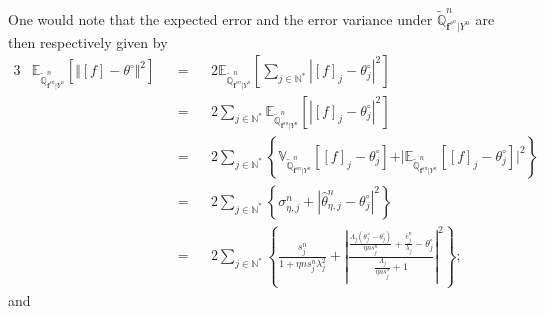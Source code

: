 One would note that the expected error and the error variance under $\widetilde{\mathds{Q}}_{\boldsymbol{f}^{s^{n}} \vert Y^{n}}^{n}$ are then respectively given by
\begin{alignat*}{3}
&\mathds{E}_{\widetilde{\mathds{Q}}_{\boldsymbol{f}^{s{n}} \vert Y^{n}}^{n}}\left[\Vert [f] - \theta^{\circ} \Vert^{2}\right] &&=&& 2 \mathds{E}_{\widetilde{\mathds{Q}}_{\boldsymbol{f}^{s{n}} \vert Y^{n}}^{n}}\left[\sum\limits_{j \in \mathds{N^{*}}} \left\vert[f]_{j} - \theta^{\circ}_{j} \right\vert^{2}\right]\\
& &&=&& 2 \sum\limits_{j \in \mathds{N^{*}}} \mathds{E}_{\widetilde{\mathds{Q}}_{\boldsymbol{f}^{s{n}} \vert Y^{n}}^{n}}\left[\left\vert[f]_{j} - \theta^{\circ}_{j} \right\vert^{2}\right]\\
& &&=&& 2 \sum\limits_{j \in \mathds{N^{*}}} \left\{\mathds{V}_{\widetilde{\mathds{Q}}_{\boldsymbol{f}^{s{n}} \vert Y^{n}}^{n}}\left[[f]_{j} - \theta^{\circ}_{j}\right] + \vert\mathds{E}_{\widetilde{\mathds{Q}}_{\boldsymbol{f}^{s{n}} \vert Y^{n}}^{n}}\left[[f]_{j} - \theta^{\circ}_{j}\right]\vert^{2}\right\}\\
& &&=&& 2 \sum\limits_{j \in \mathds{N^{*}}} \left\{\sigma_{\eta, j}^{n} + \left\vert\widehat{\theta}_{\eta, j}^{n} - \theta^{\circ}_{j}\right\vert^{2}\right\}\\
& &&=&& 2 \sum\limits_{j \in \mathds{N^{*}}} \left\{\frac{s_{j}^{n}}{1 + \eta n s_{j}^{n} \lambda_{j}^{2}} + \left\vert\frac{\frac{\Lambda_{j}\left(\theta^{\times}_{j} - \theta^{\circ}_{j}\right)}{\eta n s_{j}^{n}} + \frac{\overline{e}_{j}^{n}}{\lambda_{j}}- \theta^{\circ}_{j}}{\frac{\Lambda_{j}}{\eta n s_{j}^{n}} + 1}\right\vert^{2}\right\};
\end{alignat*}
and

